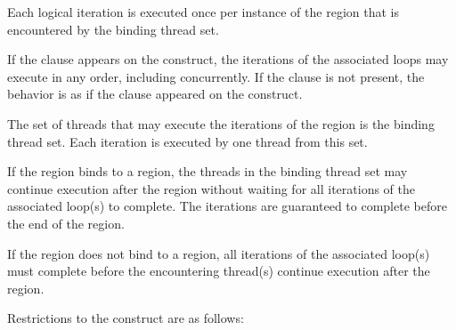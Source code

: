 Each logical iteration is executed once per instance of the 
region that is encountered by the binding thread set.

If the
 clause appears on the  construct, the
iterations of the associated loops may execute in any order, including
concurrently. If the  clause is not present, the behavior is as if
the  clause appeared on the construct.

The set of threads that may execute the iterations of the  region
is the binding thread set. Each iteration is executed by one thread from this
set.

If the  region binds to a  region, the threads in the
binding thread set may continue execution after the  region without
waiting for all iterations of the associated loop(s) to complete. The
iterations are guaranteed to complete before the end of the 
region. 

If the  region does not bind to a  region, all
iterations of the associated loop(s) must complete before the encountering
thread(s) continue execution after the  region.





\restrictions
Restrictions to the  construct are as follows:

